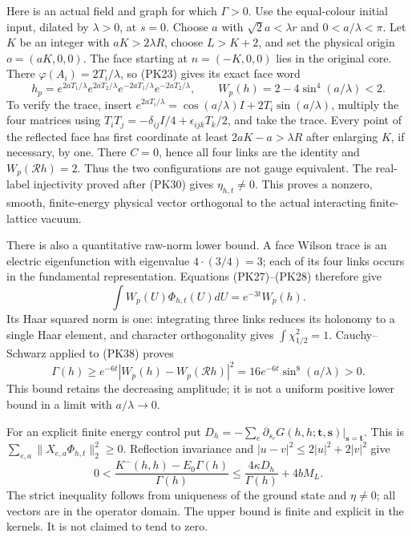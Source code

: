 \documentclass[11pt]{article}
\begin{document}
Here is an actual field and graph for which \(\Gamma>0\). Use the
equal-colour initial input, dilated by \(\lambda>0\), at \(s=0\).
Choose \(a\) with \(\sqrt2a<\lambda r\) and \(0<a/\lambda<\pi\).
Let \(K\) be an integer with \(aK>2\lambda R\), choose \(L>K+2\),
and set the physical origin \(o=(aK,0,0)\). The face starting at
\(n=(-K,0,0)\) lies in the original core. There
\(\varphi(A_i)=2T_i/\lambda\), so (PK23) gives its exact face word
\[
 h_p=e^{2aT_1/\lambda}e^{2aT_2/\lambda}
              e^{-2aT_1/\lambda}e^{-2aT_2/\lambda},\qquad
 W_p(h)=2-4\sin^4(a/\lambda)<2.
 \tag{PK40}
\]
To verify the trace, insert
\(e^{2aT_i/\lambda}=\cos(a/\lambda)I+2T_i\sin(a/\lambda)\),
multiply the four matrices using
\(T_iT_j=-\delta_{ij}I/4+\epsilon_{ijk}T_k/2\), and take the trace.
Every point of the reflected face has first coordinate at least
\(2aK-a>\lambda R\) after enlarging \(K\), if necessary, by one.
There \(C=0\), hence all four links are the identity and
\(W_p(\mathcal Rh)=2\). Thus the two configurations are not gauge
equivalent. The real-label injectivity proved after (PK30) gives
\(\eta_{h,t}\ne0\). This proves a nonzero, smooth, finite-energy
physical vector orthogonal to the actual interacting finite-lattice vacuum.

There is also a quantitative raw-norm lower bound. A face Wilson trace
is an electric eigenfunction with eigenvalue
\(4\cdot(3/4)=3\); each of its four links occurs in the fundamental
representation. Equations (PK27)–(PK28) therefore give
\[
 \int W_p(U)\Phi_{h,t}(U)dU=e^{-3t}W_p(h).
\]
Its Haar squared norm is one: integrating three links reduces its
holonomy to a single Haar element, and character orthogonality gives
\(\int\chi_{1/2}^2=1\). Cauchy–Schwarz applied to (PK38) proves
\[
 \Gamma(h)\ge e^{-6t}|W_p(h)-W_p(\mathcal Rh)|^2
       =16e^{-6t}\sin^8(a/\lambda)>0.
 \tag{PK41}
\]
This bound retains the decreasing amplitude; it is not a uniform
positive lower bound in a limit with \(a/\lambda\to0\).

For an explicit finite energy control put
\(D_h=-\sum_e\partial_{s_e}G(h,h;\mathbf t,\mathbf s)|_{\mathbf s=\mathbf t}\).
This is \(\sum_{e,a}\|X_{e,a}\Phi_{h,t}\|_2^2\ge0\). Reflection
invariance and \(|u-v|^2\le2|u|^2+2|v|^2\) give
\[
 0<\frac{K^-(h,h)-E_0\Gamma(h)}{\Gamma(h)}
 \le \frac{4\kappa D_h}{\Gamma(h)}+4bM_L.
 \tag{PK42}
\]
The strict inequality follows from uniqueness of the ground state and
\(\eta\ne0\); all vectors are in the operator domain. The upper bound
is finite and explicit in the kernels. It is not claimed to tend to zero.
\end{document}
